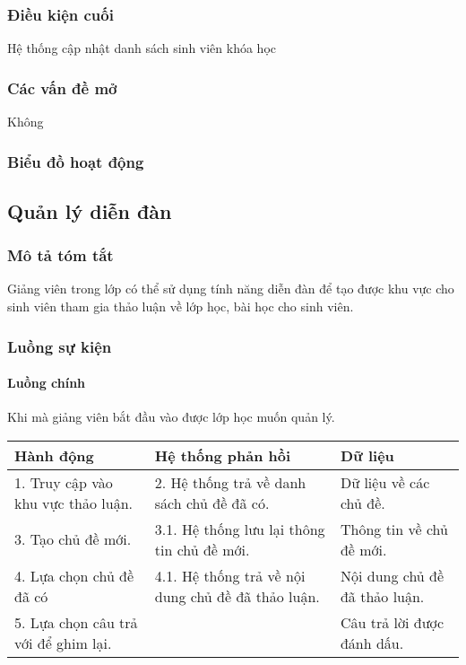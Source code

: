 \documentclass[./../main_file.tex]{subfiles}
\begin{document}
\subsubsection{Điều kiện cuối}
Hệ thống cập nhật danh sách sinh viên khóa học

\subsubsection{Các vấn đề mở}
Không

\subsubsection{Biểu đồ hoạt động}

\subsection{Quản lý diễn đàn}

\subsubsection{Mô tả tóm tắt}
Giảng viên trong lớp có thể sử dụng tính năng diễn đàn để tạo được khu vực cho sinh viên tham gia thảo luận về lớp học, bài học cho sinh viên. 

\subsubsection{Luồng sự kiện}
\paragraph{Luồng chính}
Khi mà giảng viên bắt đầu vào được lớp học muốn quản lý.
\begin{table}[H]
				\begin{tabular}{|p{.33\textwidth}|p{}|p{}|}
		\hline
		\textbf{Hành động}                   & \textbf{Hệ thống phản hồi} & \textbf{Dữ liệu}           \\ \hline
		1. Truy cập vào khu vực thảo luận. & 2. Hệ thống trả về danh sách chủ đề đã có.         & Dữ liệu về các chủ đề.        \\ \hline
		3. Tạo chủ đề mới.                 & 3.1. Hệ thống lưu lại thông tin chủ đề mới.        & Thông tin về chủ đề mới.      \\ \hline
		4. Lựa chọn chủ đề đã có           & 4.1. Hệ thống trả về nội dung chủ đề đã thảo luận. & Nội dung chủ đề đã thảo luận. \\ \hline
		5. Lựa chọn câu trả với để ghim lại. &                            & Câu trả lời được đánh dấu. \\ \hline
	\end{tabular}
\end{table}
\end{document}
